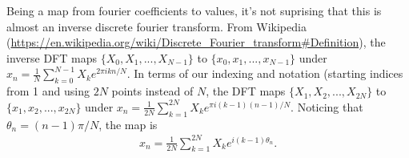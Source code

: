 Being a map from fourier coefficients to values, it's not suprising
that this is almost an inverse discrete fourier transform. From
Wikipedia 
(\url{https://en.wikipedia.org/wiki/Discrete_Fourier_transform#Definition}),
the inverse DFT maps $\lbrace X_0, X_1, ..., X_{N-1} \rbrace$
to $\lbrace x_0, x_1, ..., x_{N-1} \rbrace$ under
$x_n = \frac{1}{N} \sum_{k=0}^{N-1} X_k e^{2\pi i k n/N}$. In terms of
our indexing and notation (starting indices from 1 and using $2N$ points
instead of $N$, the DFT maps $\lbrace X_1,X_2,...,X_{2N} \rbrace$
to $\lbrace x_1,x_2,...,x_{2N} \rbrace$ under
$x_n = \frac{1}{2N} \sum_{k=1}^{2N} X_k e^{\pi i (k-1)(n-1)/N}$.
Noticing that $\theta_n = (n-1)\pi/N$, the map is
\begin{align*}
x_n = \frac{1}{2N} \sum_{k=1}^{2N} X_k e^{i(k-1) \theta_n}.
\end{align*}

